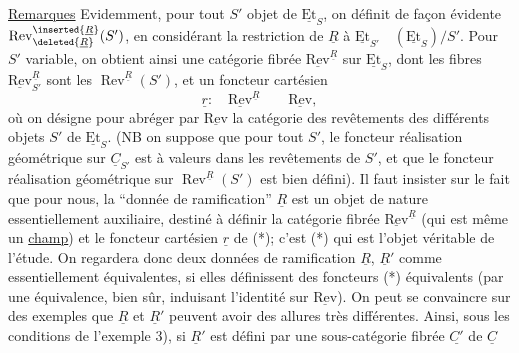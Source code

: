 \uline{Remarques} Evidemment, pour tout $S'$ objet de $\underline{\mathrm{Et}}_S$, on définit de façon évidente $\operatorname{Rev}_{\deleted{\underline{R}}}^{\inserted{\underline{R}}}(S')$, en considérant la restriction de $\underline{R}$ à $\underline{\mathrm{Et}}_{S'}\quad(\underline{\mathrm{Et}}_S)/S'$. Pour $S'$ variable, on obtient ainsi une catégorie fibrée $\underline{\mathrm{Rev}}^{\underline{R}}$ sur $\underline{\mathrm{Et}}_S$, dont les fibres $\underline{\mathrm{Rev}}_{S'}^{\underline{R}}$ sont les $\operatorname{Rev}^{\underline{R}}(S')$, et un foncteur cartésien
\[
\underline{r}:\quad\underline{\mathrm{Rev}}^{\underline{R}}\qquad\underline{\mathrm{Rev}},
\tag*{(*)}
\]
où on désigne pour abréger par $\underline{\mathrm{Rev}}$ la catégorie  des revêtements des différents objets $S'$ de $\underline{\mathrm{Et}}_S$. (NB on suppose que pour tout $S'$, le foncteur réalisation géométrique sur $\underline{C}_{S'}$ est à valeurs dans les revêtements de $S'$, et que le foncteur réalisation géométrique sur $\operatorname{Rev}^{\underline{R}}(S')$ est bien défini). Il faut insister sur le fait que pour nous, la ``donnée de ramification'' $\underline{R}$ est un objet de nature essentiellement auxiliaire, destiné à définir la catégorie fibrée $\underline{\mathrm{Rev}}^{\underline{R}}$ (qui est même un \uline{champ}) et le foncteur cartésien $\underline{r}$ de (*); c'est (*) qui est l'objet véritable de l'étude. On regardera donc deux données de ramification $\underline{R}$, $\underline{R}'$ comme essentiellement équivalentes, si elles définissent des foncteurs (*) équivalents (par une équivalence, bien sûr, induisant l'identité sur $\underline{\mathrm{Rev}}$). On peut se convaincre sur des exemples que $\underline{R}$ et $\underline{R}'$ peuvent avoir des allures très différentes. Ainsi, sous les conditions de l'exemple 3), si $\underline{R}'$ est défini par une sous-catégorie fibrée  $\underline{C'}$ de $\underline{C}$
